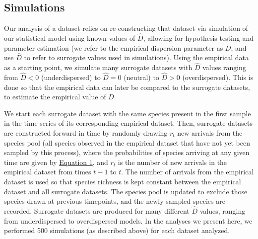 \documentclass{article}
\begin{document}
\subsection{Simulations} \label{sec:simulations}
Our analysis of a dataset relies on re-constructing that dataset via simulation of our statistical model using known values of \(\hat{D}\), allowing for hypothesis testing and parameter estimation (we refer to the empirical dispersion parameter as \(D\), and use \(\hat{D}\) to refer to surrogate values used in simulations). Using the empirical data as a starting point, we simulate many surrogate datasets with \(\hat{D}\) values ranging from \(\hat{D}<0\) (underdispersed) to \(\hat{D}=0\) (neutral) to \(\hat{D}>0\) (overdispersed). This is done so that the empirical data can later be compared to the surrogate datasets, to estimate the empirical value of \(D\).
\par
We start each surrogate dataset with the same species present in the first sample in the time-series of its corresponding empirical dataset. Then, surrogate datasets are constructed forward in time by randomly drawing \(r_t\) new arrivals from the species pool (all species observed in the empirical dataset that have not yet been sampled by this process), where the probabilities of species arriving at any given time are given by  \hyperref[sec:equation1]{Equation 1}, and \(r_t\) is the number of new arrivals in the empirical dataset from times \(t-1\) to \(t\). The number of arrivals from the empirical dataset is used so that species richness is kept constant between the empirical dataset and all surrogate datasets. The species pool is updated to exclude those species drawn at previous timepoints, and the newly sampled species are recorded. Surrogate datasets are produced for many different \(\hat{D}\) values, ranging from underdispersed to overdispersed models. In the analyses we present here, we performed 500 simulations (as described above) for each dataset analyzed.
\end{document}
